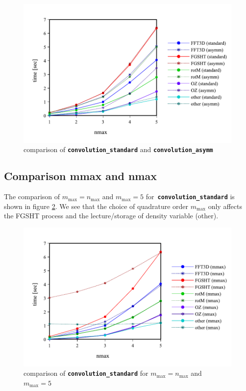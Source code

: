 \begin{figure}[H]
\begin{centering}
\includegraphics[bb=0bp 20bp 432bp 268bp,scale=0.6]{_figure/results/asymm}
\par\end{centering}
\caption{comparison of \texttt{\textbf{convolution\_standard}} and \texttt{\textbf{convolution\_asymm\label{fig:comparison-asymm}}}}
\end{figure}


\subsection{Comparison mmax and nmax}

The comparison of $m_{\max}=n_{\max}$ and $m_{\max}=5$ for\texttt{\textbf{
convolution\_standard}} is shown in figure \ref{fig:comparison-nmax}.
We see that the choice of quadrature order $m_{\max}$ only affects
the FGSHT process and the lecture/storage of density variable (other).

\begin{figure}[H]
\begin{centering}
\includegraphics[bb=0bp 20bp 432bp 268bp,scale=0.6]{_figure/results/nmax}
\par\end{centering}
\caption{comparison of \texttt{\textbf{convolution\_standard}} for $m_{\max}=n_{\max}$
and $m_{\max}=5$\label{fig:comparison-nmax}}
\end{figure}



